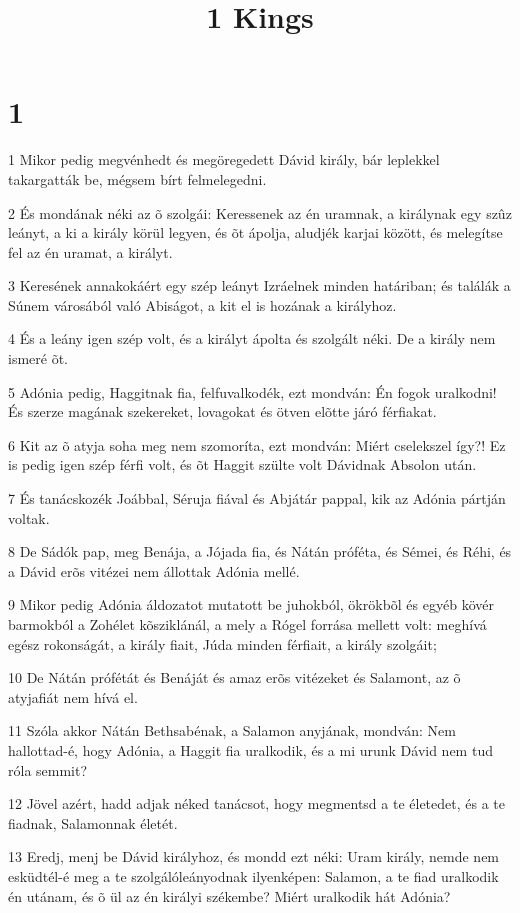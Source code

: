 

\title{1 Kings}


\chapter{1}

\par 1 Mikor pedig megvénhedt és megöregedett Dávid király, bár leplekkel takargatták be, mégsem bírt felmelegedni.
\par 2 És mondának néki az õ szolgái: Keressenek az én uramnak, a királynak egy szûz leányt, a ki a király körül legyen, és õt ápolja, aludjék karjai között, és melegítse fel az én uramat, a királyt.
\par 3 Keresének annakokáért egy szép leányt Izráelnek minden határiban; és találák a Súnem városából való Abiságot,  a kit el is hozának a királyhoz.
\par 4 És a leány igen szép volt, és a királyt ápolta és szolgált néki. De a király nem ismeré õt.
\par 5 Adónia pedig, Haggitnak fia, felfuvalkodék, ezt mondván: Én fogok uralkodni! És szerze magának szekereket, lovagokat és ötven elõtte járó férfiakat.
\par 6 Kit az õ atyja soha meg nem szomoríta, ezt mondván: Miért cselekszel így?! Ez is pedig igen szép férfi volt, és õt Haggit szülte volt Dávidnak Absolon után.
\par 7 És tanácskozék Joábbal, Séruja fiával és Abjátár pappal, kik az Adónia pártján voltak.
\par 8 De Sádók pap, meg Benája, a Jójada fia, és Nátán  próféta, és Sémei, és Réhi, és a Dávid erõs vitézei nem állottak Adónia mellé.
\par 9 Mikor pedig Adónia áldozatot mutatott be juhokból, ökrökbõl és egyéb kövér barmokból a Zohélet kõsziklánál, a mely a Rógel forrása mellett volt: meghívá egész rokonságát, a király fiait, Júda minden férfiait, a király szolgáit;
\par 10 De Nátán prófétát és Benáját és amaz erõs vitézeket és Salamont, az õ atyjafiát nem hívá el.
\par 11 Szóla akkor Nátán Bethsabénak, a Salamon anyjának, mondván: Nem hallottad-é, hogy Adónia, a Haggit fia uralkodik, és a mi urunk Dávid nem tud róla semmit?
\par 12 Jövel azért, hadd adjak néked tanácsot, hogy megmentsd a te életedet, és a te fiadnak, Salamonnak életét.
\par 13 Eredj, menj be Dávid királyhoz, és mondd ezt néki: Uram király, nemde nem esküdtél-é meg a te szolgálóleányodnak ilyenképen: Salamon, a te fiad uralkodik én utánam, és õ ül az én királyi székembe? Miért uralkodik hát Adónia?
